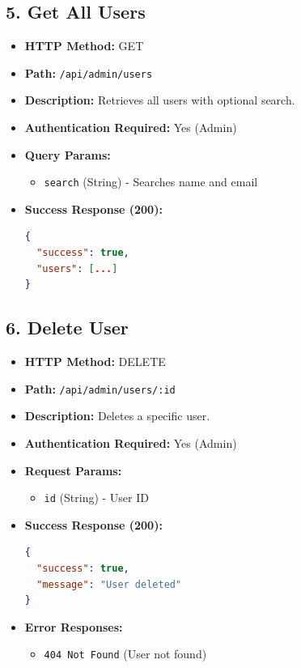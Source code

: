 \documentclass[12pt,a4paper]{article}
\begin{document}
\subsection{5. Get All Users}
\begin{itemize}
    \item \textbf{HTTP Method:} GET
    \item \textbf{Path:} \texttt{/api/admin/users}
    \item \textbf{Description:} Retrieves all users with optional search.
    \item \textbf{Authentication Required:} Yes (Admin)
    \item \textbf{Query Params:}
    \begin{itemize}
        \item \texttt{search} (String) - Searches name and email
    \end{itemize}
    \item \textbf{Success Response (200):}
\begin{lstlisting}[language=json]
{
  "success": true,
  "users": [...]
}
\end{lstlisting}
\end{itemize}

\subsection{6. Delete User}
\begin{itemize}
    \item \textbf{HTTP Method:} DELETE
    \item \textbf{Path:} \texttt{/api/admin/users/:id}
    \item \textbf{Description:} Deletes a specific user.
    \item \textbf{Authentication Required:} Yes (Admin)
    \item \textbf{Request Params:}
    \begin{itemize}
        \item \texttt{id} (String) - User ID
    \end{itemize}
    \item \textbf{Success Response (200):}
\begin{lstlisting}[language=json]
{
  "success": true,
  "message": "User deleted"
}
\end{lstlisting}
    \item \textbf{Error Responses:}
    \begin{itemize}
        \item \texttt{404 Not Found} (User not found)
    \end{itemize}
\end{itemize}
\end{document}
